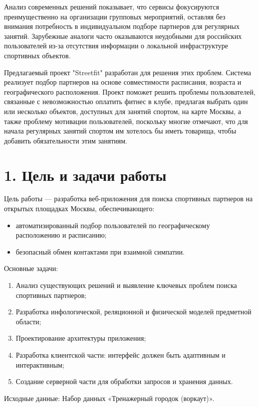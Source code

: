 \documentclass[14pt]{article}
\begin{document}
Анализ современных решений показывает, что сервисы фокусируются преимущественно на организации групповых мероприятий, оставляя без внимания
потребность в индивидуальном подборе партнеров для регулярных занятий. Зарубежные аналоги часто оказываются неудобными для российских пользователей
из-за отсутствия информации о локальной инфраструктуре спортивных объектов.

Предлагаемый проект "Streetfit" разработан для решения этих проблем. Система реализует подбор партнеров на основе совместимости расписания,
возраста и географического расположения. Проект поможет решить проблемы пользователей, связанные с невозможностью оплатить фитнес в клубе,
предлагая выбрать один или несколько объектов, доступных для занятий спортом, на карте Москвы, а также проблему мотивации пользователей,
поскольку многие отмечают, что для начала регулярных занятий спортом им хотелось бы иметь товарища, чтобы добавить обязательности этим занятиям.

\newpage

\section*{1. Цель и задачи работы}
Цель работы — разработка веб-приложения для поиска спортивных партнеров на открытых площадках Москвы, обеспечивающего:
\begin{itemize}[noitemsep, topsep=0pt]
	\item автоматизированный подбор пользователей по географическому расположению и расписанию;
	\item безопасный обмен контактами при взаимной симпатии.
\end{itemize}
\indent Основные задачи:
\begin{enumerate}[noitemsep, topsep=0pt]
	\item Анализ существующих решений и выявление ключевых проблем поиска спортивных партнеров;
	\item Разработка инфологической, реляционной и физической моделей предметной области;
	\item Проектирование архитектуры приложения;
	\item Разработка клиентской части: интерфейс должен быть адаптивным и интерактивным;
	\item Создание серверной части для обработки запросов и хранения данных.
\end{enumerate}

Исходные данные: Набор данных «Тренажерный городок (воркаут)».
\end{document}

